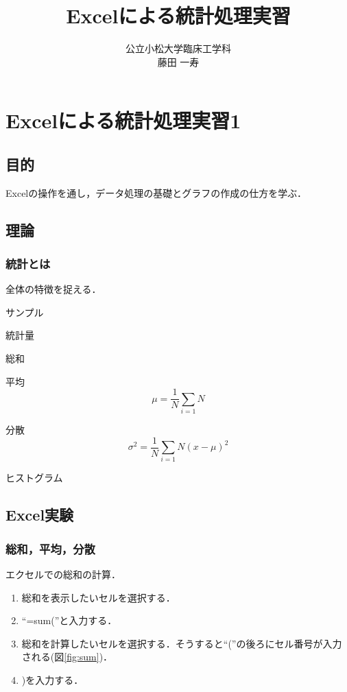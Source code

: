 \documentclass[12pt, a4j]{jreport}
\title{Excelによる統計処理実習}
\author{公立小松大学臨床工学科 \\ 藤田 一寿}
\date{}
\begin{document}
\maketitle

\chapter{Excelによる統計処理実習1}

\section{目的}

Excelの操作を通し，データ処理の基礎とグラフの作成の仕方を学ぶ．

\section{理論}

\subsection{統計とは}


全体の特徴を捉える．

サンプル

統計量

総和


平均
\begin{equation}
    \mu = \frac{1}{N} \sum_{i=1}{N}
\end{equation}


分散
\begin{equation}
    \sigma^2 = \frac{1}{N} \sum_{i=1}{N} (x - \mu)^2
\end{equation}

ヒストグラム

\section{Excel実験}

\subsection{総和，平均，分散}

エクセルでの総和の計算．

\begin{enumerate}
    \item 総和を表示したいセルを選択する．
    \item ``=sum(''と入力する．
    \item 総和を計算したいセルを選択する．そうすると``(''の後ろにセル番号が入力される(図\ref{fig:sum})．
    \item )を入力する．
\end{enumerate}
\end{document}

